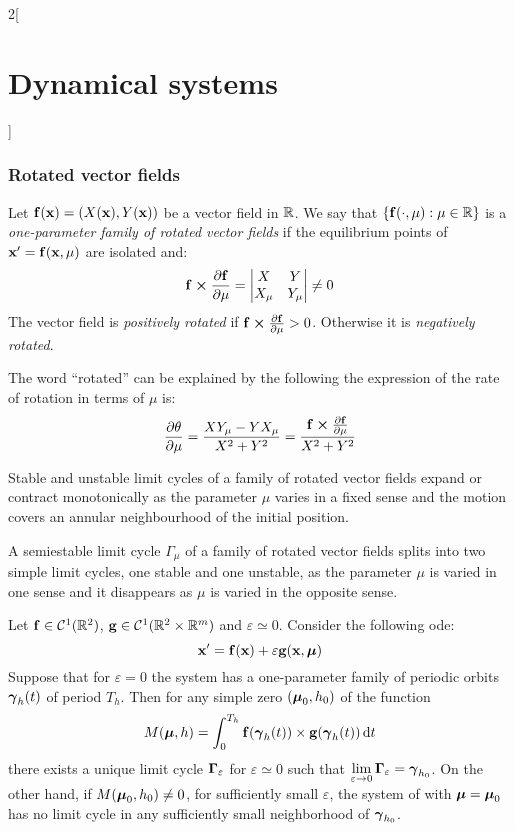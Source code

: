 \documentclass[../../../main_math.tex]{subfiles}
\begin{document}
\begin{multicols}{2}[\section{Dynamical systems}]
  \subsubsection{Rotated vector fields}
  \begin{definition}
    Let $\boldsymbol{\mathrm{f}}(\boldsymbol{\mathrm{x}})=(X(\boldsymbol{\mathrm{x}}),Y(\boldsymbol{\mathrm{x}}))$ be a vector field in $\mathbb{R}$. We say that $\{\boldsymbol{\mathrm{f}}(\cdot,\mu):\mu\in\mathbb{R}\}$ is a \emph{one-parameter family of rotated vector fields} if the equilibrium points of $\boldsymbol{\mathrm{x}}'=\boldsymbol{\mathrm{f}}(\boldsymbol{\mathrm{x}},\mu)$ are isolated and:
    $$\vf{f}\crossprod\pdv{\vf{f}}{\mu}=
      \begin{vmatrix}
        X     & Y     \\
        X_\mu & Y_\mu
      \end{vmatrix}\ne 0
    $$
    The vector field is \emph{positively rotated} if $\vf{f}\crossprod\pdv{\vf{f}}{\mu}>0$. Otherwise it is \emph{negatively rotated}.
  \end{definition}
  \begin{remark}
    The word ``rotated'' can be explained by the following the expression of the rate of rotation in terms of $\mu$ is:
    $$\pdv{\theta}{\mu}=\frac{XY_\mu-YX_\mu}{X^2+Y^2}=\frac{\vf{f}\crossprod\pdv{\vf{f}}{\mu}}{X^2+Y^2}$$
  \end{remark}
  \begin{theorem}
    Stable and unstable limit cycles of a family of rotated vector fields expand or contract monotonically as the parameter $\mu$ varies in a fixed sense and the motion covers an annular neighbourhood of the initial position.
  \end{theorem}
  \begin{theorem}
    A semiestable limit cycle $\Gamma_\mu$ of a family of rotated vector fields splits into two simple limit cycles, one stable and one unstable, as the parameter $\mu$ is varied in one sense and it disappears as $\mu$ is varied in the opposite sense.
  \end{theorem}
  \begin{theorem}
    Let $\boldsymbol{\mathrm{f}}\in\mathcal{C}^1(\mathbb{R}^2)$, $\boldsymbol{\mathrm{g}}\in\mathcal{C}^1(\mathbb{R}^2\times\mathbb{R}^m)$ and $\varepsilon\simeq 0$. Consider the following ode:
    \begin{equation}\label{DS:melnikov}
      \boldsymbol{\mathrm{x}}'=\boldsymbol{\mathrm{f}}(\boldsymbol{\mathrm{x}})+\varepsilon\boldsymbol{\mathrm{g}}(\boldsymbol{\mathrm{x}},\boldsymbol{\mathrm{\mu}})
    \end{equation}
    Suppose that for $\varepsilon =0$ the system has a one-parameter family of periodic orbits $\boldsymbol{\mathrm{\gamma}}_h(t)$ of period $T_h$. Then for any simple zero $(\boldsymbol{\mathrm{\mu}}_0,h_0)$ of the function $$M(\boldsymbol{\mathrm{\mu}}, h)=\int_{0}^{T_h}\boldsymbol{\mathrm{f}}(\boldsymbol{\mathrm{\gamma}}_h(t))\times \boldsymbol{\mathrm{g}}(\boldsymbol{\mathrm{\gamma}}_h(t))\dd{t}$$ there exists a unique limit cycle $\boldsymbol{\mathrm{\Gamma}}_\varepsilon$ for $\varepsilon\simeq 0$ such that $\displaystyle\lim_{\varepsilon\to 0}\boldsymbol{\mathrm{\Gamma}}_\varepsilon=\boldsymbol{\mathrm{\gamma}}_{h_0}$. On the other hand, if $M(\boldsymbol{\mathrm{\mu}}_0,h_0)\ne 0$, for sufficiently small $\varepsilon$, the system of  with $\boldsymbol{\mathrm{\mu}}=\boldsymbol{\mathrm{\mu}}_0$ has no limit cycle in any sufficiently small neighborhood of $\boldsymbol{\mathrm{\gamma}}_{h_0}$.

\end{theorem}
\end{multicols}
\end{document}

